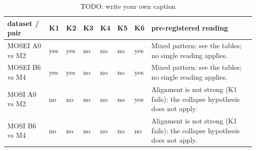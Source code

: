 \begin{table}[h]
\caption{TODO: write your own caption}\label{tab:T11-eq15-criteria}
\scriptsize
\begin{tabularx}{\textwidth}{lllllll>{\raggedright\arraybackslash}X}
\toprule
dataset /\allowbreak{} pair & K1 & K2 & K3 & K4 & K5 & K6 & pre-registered reading \\
\midrule
MOSEI A0 vs M2 & yes & yes & no & no & no & yes & Mixed pattern: see the tables; no single reading applies. \\
MOSEI B6 vs M4 & yes & yes & no & no & no & yes & Mixed pattern: see the tables; no single reading applies. \\
MOSI A0 vs M2 & no & no & no & no & no & yes & Alignment is not strong (K1 fails): the collapse hypothesis does not apply. \\
MOSI B6 vs M4 & no & no & no & no & no & no & Alignment is not strong (K1 fails): the collapse hypothesis does not apply. \\
\bottomrule
\end{tabularx}
\par{}
\end{table}
